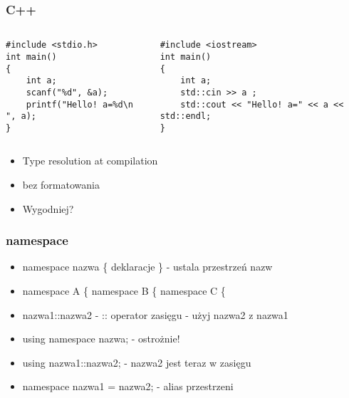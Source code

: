 \documentclass[10pt]{beamer}
\begin{document}
\begin{frame}[fragile]
  \frametitle{ C++}
  \begin{columns}
    \begin{column}{0.48\textwidth}
      \begin{lstlisting}
#include <stdio.h>
int main()
{
    int a;
    scanf("%d", &a);
    printf("Hello! a=%d\n ", a);
}
      \end{lstlisting}
    \end{column}
    \begin{column}{0.48\textwidth}
      \begin{lstlisting}
#include <iostream>
int main()
{
    int a;
    std::cin >> a ;
    std::cout << "Hello! a=" << a << std::endl;
}
      \end{lstlisting}
    \end{column}
  \end{columns}
  \centering
  \begin{itemize}
    \item Type resolution at compilation
    \item bez formatowania
    \item Wygodniej?
  \end{itemize}
  
\end{frame}

\begin{frame}
  \frametitle{namespace}
    
  \begin{itemize}
    \item namespace nazwa \{ deklaracje \} - ustala przestrzeń nazw
    \item namespace A \{ namespace B \{ namespace C \{
    \item nazwa1::nazwa2 - :: operator zasięgu - użyj nazwa2 z nazwa1
    \item using namespace nazwa; - ostrożnie!
    \item using nazwa1::nazwa2; - nazwa2 jest teraz w zasięgu
    \item namespace nazwa1 = nazwa2; - alias przestrzeni
  \end{itemize}
    
\end{frame}
\end{document}
